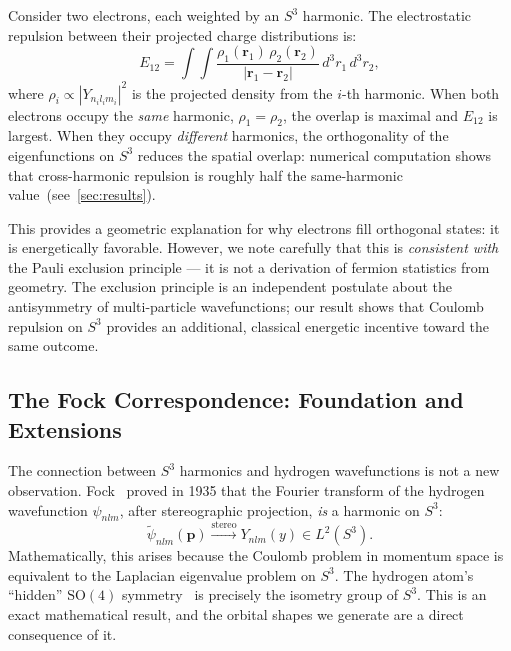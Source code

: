 \documentclass[12pt, a4paper]{article}
\theoremstyle{definition}
\theoremstyle{remark}
\newcommand{\Sthree}{S^3}
\newcommand{\SO}{\mathrm{SO}}
\begin{document}
Consider two electrons, each weighted by an $\Sthree$ harmonic. The
electrostatic repulsion between their projected charge distributions is:
\begin{equation}
  E_{12} = \int\!\!\int \frac{\rho_1(\mathbf{r}_1)\,\rho_2(\mathbf{r}_2)}
  {|\mathbf{r}_1 - \mathbf{r}_2|}\,d^3\!r_1\,d^3\!r_2,
  \label{eq:coulomb_repulsion}
\end{equation}
where $\rho_i \propto |Y_{n_i l_i m_i}|^2$ is the projected density from
the $i$-th harmonic. When both electrons occupy the \emph{same} harmonic,
$\rho_1 = \rho_2$, the overlap is maximal and $E_{12}$ is largest. When they
occupy \emph{different} harmonics, the orthogonality of the eigenfunctions
on $\Sthree$ reduces the spatial overlap: numerical computation shows that
cross-harmonic repulsion is roughly half the same-harmonic
value~(see~\cref{sec:results}).

This provides a geometric explanation for why electrons fill orthogonal
states: it is energetically favorable. However, we note carefully that this
is \emph{consistent with} the Pauli exclusion principle --- it is not a
derivation of fermion statistics from geometry. The exclusion principle is an
independent postulate about the antisymmetry of multi-particle wavefunctions;
our result shows that Coulomb repulsion on $\Sthree$ provides an additional,
classical energetic incentive toward the same outcome.

\subsection{The Fock Correspondence: Foundation and Extensions}
\label{sec:fock}

The connection between $\Sthree$ harmonics and hydrogen wavefunctions is not
a new observation. Fock~\cite{fock1935} proved in 1935 that the Fourier
transform of the hydrogen wavefunction $\psi_{nlm}$, after stereographic
projection, \emph{is} a harmonic on $\Sthree$:
\begin{equation}
  \tilde{\psi}_{nlm}(\mathbf{p})
  \xrightarrow{\text{stereo}} Y_{nlm}(y) \in L^2(\Sthree).
  \label{eq:fock}
\end{equation}
Mathematically, this arises because the Coulomb problem in momentum space is
equivalent to the Laplacian eigenvalue problem on $\Sthree$. The hydrogen
atom's ``hidden'' $\SO(4)$ symmetry~\cite{pauli1926,bander1966} is
precisely the isometry group of $\Sthree$. This is an exact mathematical
result, and the orbital shapes we generate are a direct consequence of it.
\end{document}
